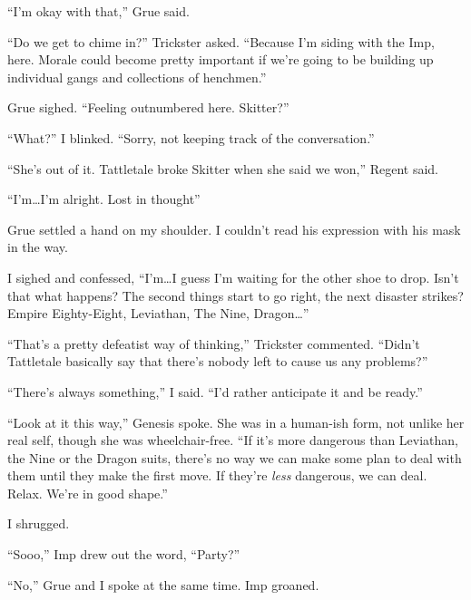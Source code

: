 ``I'm okay with that,'' Grue said.



``Do we get to chime in?'' Trickster asked.  ``Because I'm siding with the Imp, here.  Morale could become pretty important if we're going to be building up individual gangs and collections of henchmen.''



Grue sighed.  ``Feeling outnumbered here.  Skitter?''



``What?''  I blinked.  ``Sorry, not keeping track of the conversation.''



``She's out of it.  Tattletale broke Skitter when she said we won,'' Regent said.



``I'm\ldots I'm alright.  Lost in thought''



Grue settled a hand on my shoulder.  I couldn't read his expression with his mask in the way.



I sighed and confessed, ``I'm\ldots I guess I'm waiting for the other shoe to drop.  Isn't that what happens?  The second things start to go right, the next disaster strikes?  Empire Eighty-Eight, Leviathan, The Nine, Dragon\ldots''



``That's a pretty defeatist way of thinking,'' Trickster commented.  ``Didn't Tattletale basically say that there's nobody left to cause us any problems?''



``There's always something,'' I said.  ``I'd rather anticipate it and be ready.''



``Look at it this way,'' Genesis spoke.  She was in a human-ish form, not unlike her real self, though she was wheelchair-free.  ``If it's more dangerous than Leviathan, the Nine or the Dragon suits, there's no way we can make some plan to deal with them until they make the first move.  If they're \emph{less} dangerous, we can deal.  Relax.  We're in good shape.''



I shrugged.



``Sooo,'' Imp drew out the word, ``Party?''



``No,'' Grue and I spoke at the same time.  Imp groaned.



